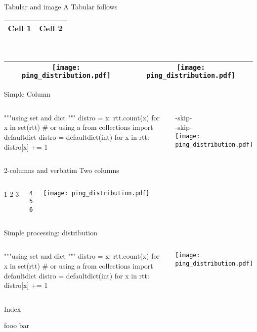 \begin{pyframe}{Tabular and image}
A Tabular follows \\
\begin{tabular}{|c|c|}\hline
Cell 1 & Cell 2 \\
\hline 
\end{tabular}
\\
\begin{table}
\begin{tabular}{|c|c|}\hline
\texttt{[image: ping\_distribution.pdf]}   & \texttt{[image: ping\_distribution.pdf]}  \\
\hline 
\end{tabular}
\end{table}
\end{pyframe}

\begin{pyframe}{Simple Column}
\begin{columns}
\column[t]{6cm}
\begin{pycode}
"""using set and dict
"""
distro = {x: rtt.count(x) 
  for x in set(rtt)}
# or using a
from collections import defaultdict
distro = defaultdict(int)
for x in rtt:
    distro[x] += 1
    

\end{pycode}
\column[t]{5cm}
-skip-\\
-skip-\\
\texttt{[image: ping\_distribution.pdf]}  
\end{columns}
\end{pyframe}


\begin{pyframe}{2-columns and verbatim}
Two columns
\begin{columns}

\column[t]{5cm}
1
2
3
\begin{verbatim}
4
5
6
\end{verbatim}

\column[t]{5cm}
\texttt{[image: ping\_distribution.pdf]}  
\end{columns}

\end{pyframe}



\begin{pyframe}{Simple processing: distribution}
\begin{columns}
\column[t]{6cm}
\begin{pycode}
"""using set and dict """
distro = {x: rtt.count(x) 
  for x in set(rtt)}
# or using a
from collections import defaultdict
distro = defaultdict(int)
for x in rtt:
    distro[x] += 1
\end{pycode}
\column[t]{4cm}
\texttt{[image: ping\_distribution.pdf]}  
\end{columns}
\end{pyframe}

\begin{pyframe}{Index}

fooo bar

\end{pyframe}
